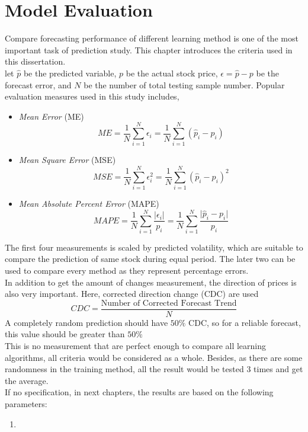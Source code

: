 \chapter{Model Evaluation}
\label{ch:modelEval}

Compare forecasting performance of different learning method is one of the most important task of prediction study. This chapter introduces the criteria used in this dissertation.\\


let $ \hat{p} $ be the predicted variable, $ p $ be the actual stock price, $ \epsilon = \hat{p} - p $ be the forecast error, and $ N $ be the number of total testing sample number. Popular evaluation measures used in this study includes\cite[Section~2.2, p.~23--24]{poon2005practical},
\begin{itemize}
	\item \textit{Mean Error} (ME)
	\begin{equation}
	ME=\frac{1}{N} \sum_{i=1}^{N}\epsilon_i=\frac{1}{N} \sum_{i=1}^{N} (\hat{p}_i - p_i)
	\end{equation}
	
	\item \textit{Mean Square Error} (MSE)
	\begin{equation}
	MSE = \frac{1}{N} \sum_{i=1}^{N}\epsilon_i^2=\frac{1}{N} \sum_{i=1}^{N} (\hat{p}_i - p_i)^2
	\end{equation}
	
	\item \textit{Mean Absolute Percent Error} (MAPE)
	\begin{equation}
	MAPE=\frac{1}{N} \sum_{i=1}^{N} \frac{\lvert \epsilon_i \rvert}{p_i} =\frac{1}{N} \sum_{i=1}^{N} \frac{\lvert \hat{p}_i - p_i \rvert}{p_i}
	\end{equation}
\end{itemize}
The first four measurements is scaled by predicted volatility, which are suitable to compare the prediction of same stock during equal period. The later two can be used to compare every method as they represent percentage errors.\\


In addition to get the amount of changes measurement, the direction of prices is also very important. Here, corrected direction change (CDC)\cite{naeini2010stock} are used
\begin{equation}
CDC = \frac{\text{Number of Corrected Forecast Trend}}{N}
\end{equation}
A completely random prediction should have $ 50\% $ CDC, so for a reliable forecast, this value should be greater than $ 50\% $\\


This is no measurement that are perfect enough to compare all learning algorithms, all criteria would be considered as a whole. Besides, as there are some randomness in the training method, all the result would be tested 3 times and get the average.\\

If no specification, in next chapters, the results are based on the following parameters:
\begin{enumerate}
	\item \textbf{}
\end{enumerate}